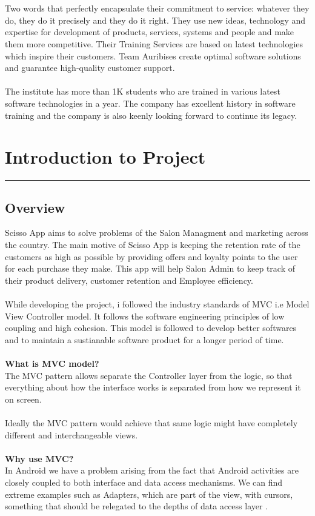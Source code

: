 \\
\\
Two words that perfectly encapsulate their commitment to service: whatever they do, they do it precisely and they do it right. They use new ideas, technology and expertise for development of products, services, systems and people and make them more competitive. Their Training Services are based on latest technologies which inspire their customers. Team Auribises create optimal software solutions and guarantee high-quality customer support.
\\
\\
The institute has more than 1K students who are trained in various latest software technologies in a year. The company has excellent history in software training and the company is also keenly looking forward to continue its legacy.

\chapter{Introduction to Project}\hrule
\label{Chapter:2}
\section{Overview}

Scisso App aims to solve problems of the Salon Managment and marketing across the country. The main motive of Scisso App is keeping the retention rate of the customers as high as possible by providing offers and loyalty points to the user for each purchase they make. This app will help Salon Admin to keep track of their product delivery, customer retention and Employee efficiency.\\
\\
While developing the project, i followed the industry standards of MVC i.e Model View Controller model. It follows the software engineering principles of low coupling and high cohesion. This model is followed to develop better softwares and to maintain a sustianable software product for a longer period of time.\\
\\
\textbf{What is MVC model?}\\
The MVC pattern allows separate the Controller layer from the logic, so that everything about how the interface works is separated from how we represent it on screen. \\
\\
Ideally the MVC pattern would achieve that same logic might have completely different and interchangeable views.\\
\\
\textbf{Why use MVC?}\\
In Android we have a problem arising from the fact that Android activities are closely coupled to both interface and data access mechanisms. We can find extreme examples such as Adapters, which are part of the view, with cursors, something that should be relegated to the depths of data access layer .

